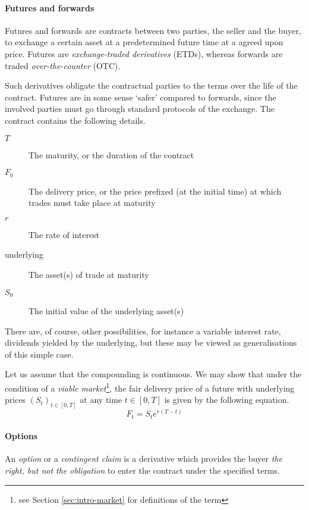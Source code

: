 \paragraph{Futures and forwards}

\begin{dfn}
	Futures and forwards are contracts between two parties, the seller and the buyer, to exchange a certain asset at a predetermined future time at a agreed upon price. Futures are \emph{exchange-traded derivatives} (ETDs), whereas forwards are traded \emph{over-the-counter} (OTC).
\end{dfn}

Such derivatives obligate the contractual parties to the terms over the life of the contract. Futures are in some sense `safer' compared to forwards, since the involved parties must go through standard protocols of the exchange.
The contract contains the following details.
\begin{description}
	\item[$ T $] The maturity, or the duration of the contract
	\item[$ F_0 $] The delivery price, or the price prefixed (at the initial time) at which trades must take place at maturity
	\item[$ r $] The rate of interest
	\item[underlying] The asset(s) of trade at maturity
	\item[$ S_0 $] The initial value of the underlying asset(s)
\end{description}
There are, of course, other possibilities, for instance a variable interest rate, dividends yielded by the underlying, but these may be viewed as generalisations of this simple case.

Let us assume that the compounding is continuous. We may show that under the condition of a \emph{viable market}\footnote{see Section \ref{sec:intro-market} for definitions of the term}, the fair delivery price of a future with underlying prices $ ( S_t )_{t \in [0, T] } $ at any time $ t \in [0, T] $ is given by the following equation.
\begin{equation}
	\label{eq:intro-future-pr}
	F_t = S_t e^{ r (T - t) }
\end{equation}


\paragraph{Options}

\begin{dfn}[option]
	An \emph{option} or a \emph{contingent claim} is a derivative which provides the buyer \emph{the right, but not the obligation} to enter the contract under the specified terms.
\end{dfn}

